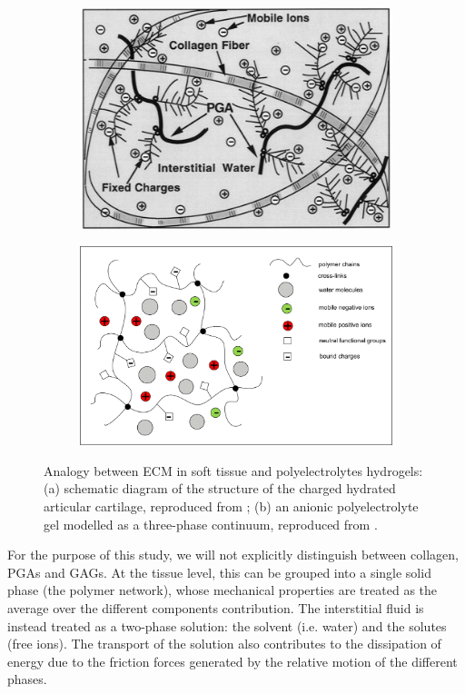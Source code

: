 \documentclass[runningheads]{llncs}
\begin{document}
\begin{figure}[h]
	\begin{subfigure}{0.49\textwidth}
		\centering
		\includegraphics[scale=0.38]{images/ECM}
		\caption{}
		\label{ECMfig_a}
	\end{subfigure}
	\begin{subfigure}{0.49\textwidth}
		\centering
		\includegraphics[scale=0.42]{images/ecmscheme.jpg}
		\caption{}
	\end{subfigure}
	\caption{Analogy between ECM in soft tissue and polyelectrolytes hydrogels: (a) schematic diagram of the structure of the charged hydrated articular cartilage, reproduced from \cite{pictureECM}; (b) an anionic polyelectrolyte gel modelled as a three-phase continuum, reproduced from \cite{DROZDOVph}.}
	\label{ECMfig}
\end{figure}

For the purpose of this study, we will not explicitly distinguish between collagen, PGAs and GAGs. At the tissue level, this can be grouped into a single solid phase (the polymer network), whose mechanical properties are treated as the average over the different components contribution. The interstitial fluid is instead treated as a two-phase solution: the solvent (i.e. water) and the solutes (free ions). The transport of the solution also contributes to the dissipation of energy due to the friction forces generated by the relative motion of the different phases.
\end{document}
